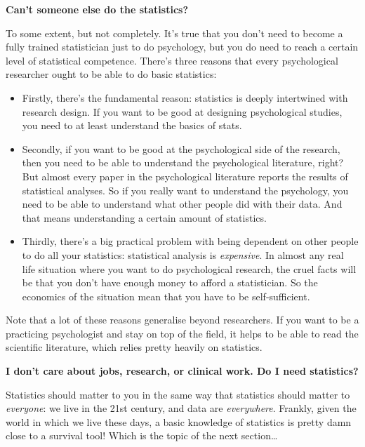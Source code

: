 \documentclass[
  11pt,
  a4paper,
  twoside,symmetric,openright]{book}
\providecommand{\tightlist}{%
  \setlength{\itemsep}{0pt}\setlength{\parskip}{0pt}}
\theoremstyle{break}
\theoremstyle{break}
\begin{document}
\textbf{Can't someone else do the statistics?}

\nopagebreak[4]

To some extent, but not completely. It's true that you don't need to become a fully trained statistician just to do psychology, but you do need to reach a certain level of statistical competence. There's three reasons that every psychological researcher ought to be able to do basic statistics:

\begin{itemize}
\tightlist
\item
  Firstly, there's the fundamental reason: statistics is deeply intertwined with research design. If you want to be good at designing psychological studies, you need to at least understand the basics of stats.
\item
  Secondly, if you want to be good at the psychological side of the research, then you need to be able to understand the psychological literature, right? But almost every paper in the psychological literature reports the results of statistical analyses. So if you really want to understand the psychology, you need to be able to understand what other people did with their data. And that means understanding a certain amount of statistics.
\item
  Thirdly, there's a big practical problem with being dependent on other people to do all your statistics: statistical analysis is \emph{expensive}. In almost any real life situation where you want to do psychological research, the cruel facts will be that you don't have enough money to afford a statistician. So the economics of the situation mean that you have to be self-sufficient.
\end{itemize}

Note that a lot of these reasons generalise beyond researchers. If you want to be a practicing psychologist and stay on top of the field, it helps to be able to read the scientific literature, which relies pretty heavily on statistics.

\textbf{I don't care about jobs, research, or clinical work. Do I need statistics?}

\nopagebreak[4]

Statistics should matter to you in the same way that statistics should matter to \emph{everyone}: we live in the 21st century, and data are \emph{everywhere}. Frankly, given the world in which we live these days, a basic knowledge of statistics is pretty damn close to a survival tool! Which is the topic of the next section\ldots{}
\end{document}
